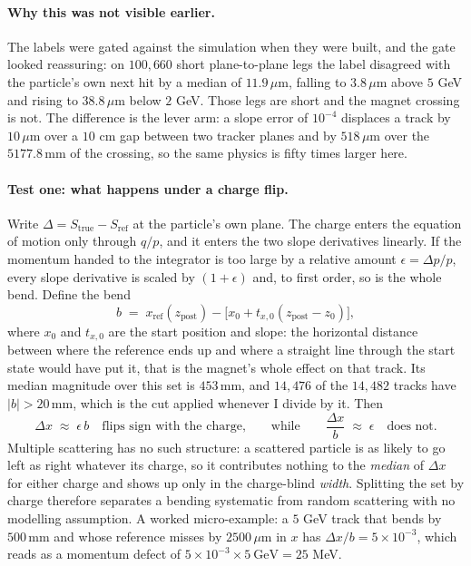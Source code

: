 \documentclass[11pt,a4paper]{article}
\newcommand{\um}{\ensuremath{\,\mu\mathrm{m}}}
\newcommand{\mm}{\ensuremath{\,\mathrm{mm}}}
\begin{document}
\paragraph{Why this was not visible earlier.} The labels were gated against the
simulation when they were built, and the gate looked reassuring: on $100{,}660$
short plane-to-plane legs the label disagreed with the particle's own next hit by
a median of $11.9\um$, falling to $3.8\um$ above $5$ GeV and rising to $38.8\um$
below $2$ GeV. Those legs are short and the magnet crossing is not. The
difference is the lever arm: a slope error of $10^{-4}$ displaces a track by
$10\um$ over a $10$ cm gap between two tracker planes and by $518\um$ over the
$5177.8\mm$ of the crossing, so the same physics is fifty times larger here.

\paragraph{Test one: what happens under a charge flip.} Write
$\Delta = S_{\mathrm{true}} - S_{\mathrm{ref}}$ at the particle's own plane. The
charge enters the equation of motion only through $q/p$, and it enters the two
slope derivatives linearly. If the momentum handed to the integrator is too large
by a relative amount $\epsilon = \Delta p / p$, every slope derivative is scaled
by $(1 + \epsilon)$ and, to first order, so is the whole bend. Define the bend
\begin{equation}
  b \;=\; x_{\mathrm{ref}}(z_{\mathrm{post}}) - \bigl[x_0 + t_{x,0}(z_{\mathrm{post}} - z_0)\bigr],
\end{equation}
where $x_0$ and $t_{x,0}$ are the start position and slope: the horizontal
distance between where the reference ends up and where a straight line through
the start state would have put it, that is the magnet's whole effect on that
track. Its median magnitude over this set is $453\mm$, and $14{,}476$ of the
$14{,}482$ tracks have $|b| > 20\mm$, which is the cut applied whenever I divide
by it. Then
\begin{equation}
  \Delta x \;\approx\; \epsilon\, b \quad \text{flips sign with the charge,}
  \qquad\text{while}\qquad
  \frac{\Delta x}{b} \;\approx\; \epsilon \quad \text{does not.}
\end{equation}
Multiple scattering has no such structure: a scattered particle is as likely to
go left as right whatever its charge, so it contributes nothing to the
\emph{median} of $\Delta x$ for either charge and shows up only in the
charge-blind \emph{width}. Splitting the set by charge therefore separates a
bending systematic from random scattering with no modelling assumption. A worked
micro-example: a $5$ GeV track that bends by $500\mm$ and whose reference misses
by $2500\um$ in $x$ has $\Delta x / b = 5 \times 10^{-3}$, which reads as a
momentum defect of $5 \times 10^{-3} \times 5\ \mathrm{GeV} = 25$ MeV.
\end{document}
